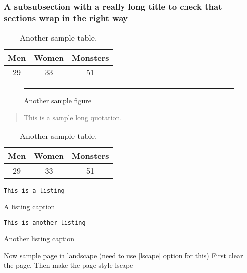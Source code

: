 \documentclass[lscape]{msu-thesis}
\begin{document}
\subsubsection{A subsubsection with a really long title to check that sections wrap in the right way}
\begin{table}
\centering
\begin{tabular}{ccc}
\toprule
Men & Women & Monsters\\
\midrule
29 & 33 & 51\\
\bottomrule
\end{tabular}
\caption{Another sample table.}
\end{table}
\lipsum[7]
\begin{exe}
\ex\label{2}
\begin{xlist}
\end{xlist}
\end{exe}
\begin{figure}
\centering
{\color{gray!40}\rule{4in}{2in}}
\caption{Another sample figure}
\end{figure}
\lipsum[2]
\begin{quote}
\SingleSpacing
This is a sample long quotation. \lipsum[2]

\hfill{\citep{munn1999}}
\end{quote}
\begin{table}
\centering
\begin{tabular}{ccc}
\toprule
Men & Women & Monsters\\
\midrule
29 & 33 & 51\\
\bottomrule
\end{tabular}
\caption{Another sample table.}
\end{table}
\begin{listing}
\begin{lstlisting}
This is a listing
\end{lstlisting}
\caption{A listing caption}
\end{listing}
\begin{listing}
\begin{lstlisting}
This is another listing
\end{lstlisting}
\caption{Another listing caption}
\end{listing}
\lipsum[8]
 Now sample page in landscape (need to use [lscape] option for this)
 First clear the page. Then make the page style {lscape}
\clearpage\pagestyle{lscape}
\end{document}

